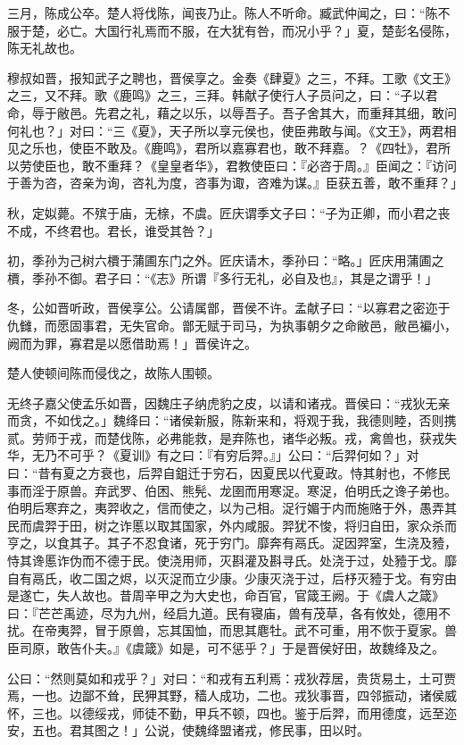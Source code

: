 \documentclass[]{article}
\begin{document}
三月，陈成公卒。楚人将伐陈，闻丧乃止。陈人不听命。臧武仲闻之，曰：``陈不服于楚，必亡。大国行礼焉而不服，在大犹有咎，而况小乎？」夏，楚彭名侵陈，陈无礼故也。

穆叔如晋，报知武子之聘也，晋侯享之。金奏《肆夏》之三，不拜。工歌《文王》之三，又不拜。歌《鹿鸣》之三，三拜。韩献子使行人子员问之，曰：``子以君命，辱于敝邑。先君之礼，藉之以乐，以辱吾子。吾子舍其大，而重拜其细，敢问何礼也？」对曰：``三《夏》，天子所以享元侯也，使臣弗敢与闻。《文王》，两君相见之乐也，使臣不敢及。《鹿鸣》，君所以嘉寡君也，敢不拜嘉。？《四牡》，君所以劳使臣也，敢不重拜？《皇皇者华》，君教使臣曰：『必咨于周。』臣闻之：『访问于善为咨，咨亲为询，咨礼为度，咨事为诹，咨难为谋。』臣获五善，敢不重拜？」

秋，定姒薨。不殡于庙，无榇，不虞。匠庆谓季文子曰：``子为正卿，而小君之丧不成，不终君也。君长，谁受其咎？」

初，季孙为己树六檟于蒲圃东门之外。匠庆请木，季孙曰：``略。」匠庆用蒲圃之檟，季孙不御。君子曰：``《志》所谓『多行无礼，必自及也』，其是之谓乎！」

冬，公如晋听政，晋侯享公。公请属鄫，晋侯不许。孟献子曰：``以寡君之密迩于仇雠，而愿固事君，无失官命。鄫无赋于司马，为执事朝夕之命敝邑，敝邑褊小，阙而为罪，寡君是以愿借助焉！」晋侯许之。

楚人使顿间陈而侵伐之，故陈人围顿。

无终子嘉父使孟乐如晋，因魏庄子纳虎豹之皮，以请和诸戎。晋侯曰：``戎狄无亲而贪，不如伐之。」魏绛曰：``诸侯新服，陈新来和，将观于我，我德则睦，否则携贰。劳师于戎，而楚伐陈，必弗能救，是弃陈也，诸华必叛。戎，禽兽也，获戎失华，无乃不可乎？《夏训》有之曰：『有穷后羿。』」公曰：``后羿何如？」对曰：``昔有夏之方衰也，后羿自鉏迁于穷石，因夏民以代夏政。恃其射也，不修民事而淫于原兽。弃武罗、伯困、熊髡、龙圉而用寒浞。寒浞，伯明氏之谗子弟也。伯明后寒弃之，夷羿收之，信而使之，以为己相。浞行媚于内而施赂于外，愚弄其民而虞羿于田，树之诈慝以取其国家，外内咸服。羿犹不悛，将归自田，家众杀而亨之，以食其子。其子不忍食诸，死于穷门。靡奔有鬲氏。浞因羿室，生浇及豷，恃其谗慝诈伪而不德于民。使浇用师，灭斟灌及斟寻氏。处浇于过，处豷于戈。靡自有鬲氏，收二国之烬，以灭浞而立少康。少康灭浇于过，后杼灭豷于戈。有穷由是遂亡，失人故也。昔周辛甲之为大史也，命百官，官箴王阙。于《虞人之箴》曰：『芒芒禹迹，尽为九州，经启九道。民有寝庙，兽有茂草，各有攸处，德用不扰。在帝夷羿，冒于原兽，忘其国恤，而思其麀牡。武不可重，用不恢于夏家。兽臣司原，敢告仆夫。』《虞箴》如是，可不惩乎？」于是晋侯好田，故魏绛及之。

公曰：``然则莫如和戎乎？」对曰：``和戎有五利焉：戎狄荐居，贵货易土，土可贾焉，一也。边鄙不耸，民狎其野，穑人成功，二也。戎狄事晋，四邻振动，诸侯威怀，三也。以德绥戎，师徒不勤，甲兵不顿，四也。鉴于后羿，而用德度，远至迩安，五也。君其图之！」公说，使魏绛盟诸戎，修民事，田以时。
\end{document}
